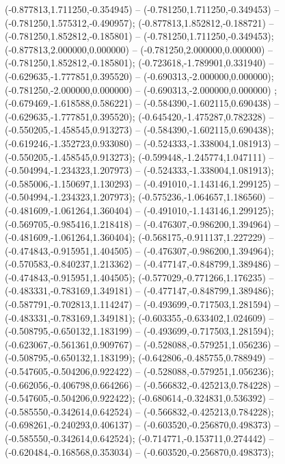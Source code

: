  (-0.877813,1.711250,-0.354945) -- (-0.781250,1.711250,-0.349453) -- (-0.781250,1.575312,-0.490957);
 (-0.877813,1.852812,-0.188721) -- (-0.781250,1.852812,-0.185801) -- (-0.781250,1.711250,-0.349453);
 (-0.877813,2.000000,0.000000) -- (-0.781250,2.000000,0.000000) -- (-0.781250,1.852812,-0.185801);
 (-0.723618,-1.789901,0.331940) -- (-0.629635,-1.777851,0.395520) -- (-0.690313,-2.000000,0.000000);
 (-0.781250,-2.000000,0.000000) -- (-0.690313,-2.000000,0.000000) ;
 (-0.679469,-1.618588,0.586221) -- (-0.584390,-1.602115,0.690438) -- (-0.629635,-1.777851,0.395520);
 (-0.645420,-1.475287,0.782328) -- (-0.550205,-1.458545,0.913273) -- (-0.584390,-1.602115,0.690438);
 (-0.619246,-1.352723,0.933080) -- (-0.524333,-1.338004,1.081913) -- (-0.550205,-1.458545,0.913273);
 (-0.599448,-1.245774,1.047111) -- (-0.504994,-1.234323,1.207973) -- (-0.524333,-1.338004,1.081913);
 (-0.585006,-1.150697,1.130293) -- (-0.491010,-1.143146,1.299125) -- (-0.504994,-1.234323,1.207973);
 (-0.575236,-1.064657,1.186560) -- (-0.481609,-1.061264,1.360404) -- (-0.491010,-1.143146,1.299125);
 (-0.569705,-0.985416,1.218418) -- (-0.476307,-0.986200,1.394964) -- (-0.481609,-1.061264,1.360404);
 (-0.568175,-0.911137,1.227229) -- (-0.474843,-0.915951,1.404505) -- (-0.476307,-0.986200,1.394964);
 (-0.570583,-0.840237,1.213362) -- (-0.477147,-0.848799,1.389486) -- (-0.474843,-0.915951,1.404505);
 (-0.577029,-0.771266,1.176235) -- (-0.483331,-0.783169,1.349181) -- (-0.477147,-0.848799,1.389486);
 (-0.587791,-0.702813,1.114247) -- (-0.493699,-0.717503,1.281594) -- (-0.483331,-0.783169,1.349181);
 (-0.603355,-0.633402,1.024609) -- (-0.508795,-0.650132,1.183199) -- (-0.493699,-0.717503,1.281594);
 (-0.623067,-0.561361,0.909767) -- (-0.528088,-0.579251,1.056236) -- (-0.508795,-0.650132,1.183199);
 (-0.642806,-0.485755,0.788949) -- (-0.547605,-0.504206,0.922422) -- (-0.528088,-0.579251,1.056236);
 (-0.662056,-0.406798,0.664266) -- (-0.566832,-0.425213,0.784228) -- (-0.547605,-0.504206,0.922422);
 (-0.680614,-0.324831,0.536392) -- (-0.585550,-0.342614,0.642524) -- (-0.566832,-0.425213,0.784228);
 (-0.698261,-0.240293,0.406137) -- (-0.603520,-0.256870,0.498373) -- (-0.585550,-0.342614,0.642524);
 (-0.714771,-0.153711,0.274442) -- (-0.620484,-0.168568,0.353034) -- (-0.603520,-0.256870,0.498373);
